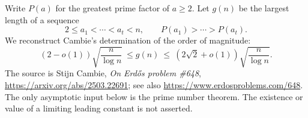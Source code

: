 Write \(P(a)\) for the greatest prime factor of \(a\geq2\).
Let \(g(n)\) be the largest length of a sequence
\[
 2\leq a_1<\cdots<a_t<n,\qquad P(a_1)>\cdots>P(a_t).
\]
We reconstruct Cambie's determination of the order of magnitude:
\[
 (2-o(1))\sqrt{\frac n{\log n}}
 \ \leq g(n)\ \leq\
 (2\sqrt2+o(1))\sqrt{\frac n{\log n}}.
\]
The source is Stijn Cambie, \emph{On Erd\H{o}s problem \#648},
\url{https://arxiv.org/abs/2503.22691}; see also
\url{https://www.erdosproblems.com/648}.
The only asymptotic input below is the prime number theorem.
The existence or value of a limiting leading constant is not asserted.
